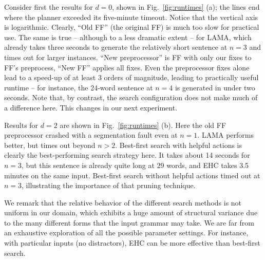 

Consider first the results for $d=0$, shown in Fig.~\ref{fig:runtimes}
(a); the lines end where the planner exceeded its five-minute
timeout. Notice that the vertical axis is logarithmic. Clearly, ``Old
FF'' (the original FF) is much too slow for practical use. The same is
true -- although to a less dramatic extent -- for LAMA, which already
takes three seconds to generate the relatively short sentence at $n=3$
and times out for larger instances. ``New preprocessor'' is FF with
only our fixes to FF's preprocess, ``New FF'' applies all fixes.
Even the preprocessor fixes alone lead to a speed-up of at least $3$
orders of magnitude, leading to practically useful runtime -- for
instance, the 24-word sentence at $n=4$ is generated in under two
seconds. Note that, by contrast, the search configuration does not
make much of a difference here. This changes in our next experiment.

Results for $d=2$ are shown in Fig.~\ref{fig:runtimes} (b).  Here the
old FF preprocessor crashed with a segmentation fault even at
$n=1$. LAMA performs better, but times out beyond $n>2$.  Best-first
search with helpful actions is clearly the best-performing search
strategy here.  It takes about 14 seconds for $n=3$, but this sentence
is already quite long at 29 words, and EHC takes 3.5 minutes on the
same input.  Best-first search without helpful actions timed out at
$n=3$, illustrating the importance of that pruning technique.

We remark that the relative behavior of the different search methods
is not uniform in our domain, which exhibits a huge amount of
structural variance due to the many different forms that the input
grammar may take. We are far from an exhaustive exploration of all the
possible parameter settings. For instance, with particular inputs (no
distractors), EHC can be more effective than best-first search.


